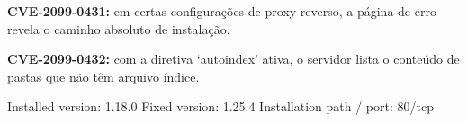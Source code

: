 \documentclass[10pt,a4paper]{article}
\begin{document}
\fieldlabel{\suriLblFldTech}
\begin{suribullets}
\item \textbf{CVE-2099-0431:} em certas configura\c{c}\~oes de proxy reverso, a
  p\'agina de erro revela o caminho absoluto de instala\c{c}\~ao.
\item \textbf{CVE-2099-0432:} com a diretiva `autoindex' ativa, o servidor lista
  o conte\'udo de pastas que n\~ao t\^em arquivo \'indice.
\end{suribullets}

\fieldlabel{\suriLblFldDetection}
\begin{termbox}
Installed version: 1.18.0
Fixed version: 1.25.4
Installation path / port: 80/tcp
\end{termbox}


\fieldlabel{\suriLblFldRefs}

\end{document}
